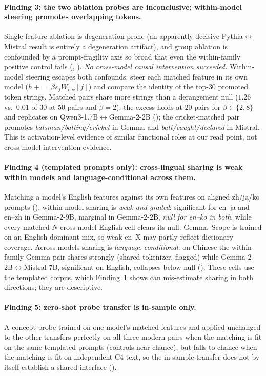 \paragraph{Finding 3: the two ablation probes are inconclusive; within-model steering promotes overlapping tokens.} Single-feature
ablation is degeneration-prone (an apparently decisive Pythia$\leftrightarrow$Mistral result is
entirely a degeneration artifact), and group ablation is confounded by a prompt-fragility axis so
broad that even the within-family positive control fails (, ).
\emph{No cross-model causal intervention succeeded.} Within-model steering escapes both
confounds: steer each matched feature in its own model
($h \mathrel{+}= \beta s_f W_{\text{dec}}[f]$) and compare the identity of the top-$30$ promoted
token strings. Matched pairs share more strings than a derangement null ($1.26$ vs.\ $0.01$ of $30$ at $50$
pairs and $\beta{=}2$); the excess holds at $20$ pairs for $\beta\in\{2,8\}$ and replicates on
\mbox{Qwen3-1.7B}$\leftrightarrow$Gemma-2-2B (); the cricket-matched pair promotes
\emph{batsman/batting/cricket} in Gemma and \emph{batt/caught/declared} in Mistral. This is
activation-level evidence of similar functional roles at our read point, not cross-model intervention evidence.

\paragraph{Finding 4 (templated prompts only): cross-lingual sharing is weak within models and
language-conditional across them.} Matching a model's
English features against its own features on aligned zh/ja/ko prompts (),
within-model sharing is \emph{weak and graded}: significant for en--ja and en--zh in Gemma-2-9B,
marginal in Gemma-2-2B, \emph{null for en--ko in both}, while every matched-$N$ cross-model
English cell clears its null. Gemma~Scope \citep{lieberum2024gemmascope} is trained on an
English-dominant mix, so weak en--X may partly reflect dictionary coverage. Across models sharing
is \emph{language-conditional}: on Chinese the within-family Gemma pair shares strongly (shared
tokenizer, flagged) while Gemma-2-2B$\leftrightarrow$Mistral-7B, significant on English, collapses below
null (). These cells use the templated corpus, which Finding~1 shows can
mis-estimate sharing in both directions; they are descriptive.

\paragraph{Finding 5: zero-shot probe transfer is in-sample only.} A concept probe trained on
one model's matched features and applied unchanged to the other transfers perfectly on all three
modern pairs when the matching is fit on the same templated prompts (controls near chance), but
falls to chance when the matching is fit on independent C4 text, so the in-sample transfer does not by itself establish a shared interface
().

